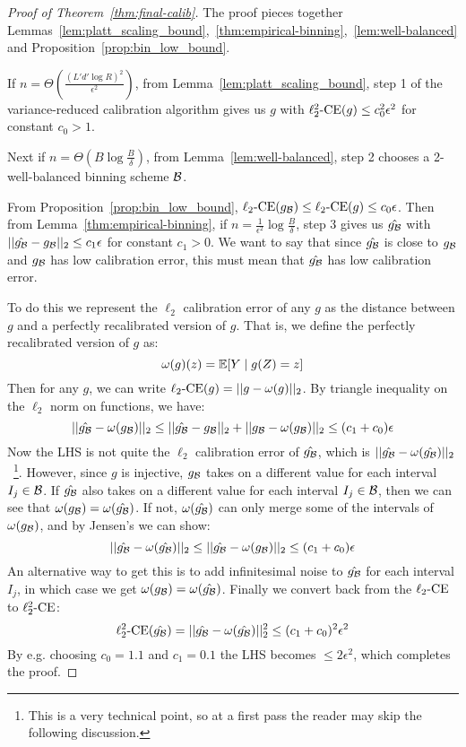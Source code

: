 \begin{proof}[Proof of Theorem~\ref{thm:final-calib}]
The proof pieces together Lemmas~\ref{lem:platt_scaling_bound},~\ref{thm:empirical-binning},~\ref{lem:well-balanced} and Proposition~\ref{prop:bin_low_bound}.

If $n = \Theta(\frac{(L'd'\log{R})^2}{\epsilon^2})$, from Lemma~\ref{lem:platt_scaling_bound}, step 1 of the variance-reduced calibration algorithm gives us $g$ with $\ell_2^2\mbox{-CE}(g) \leq c_0^2 \epsilon^2$ for constant $c_0 > 1$.

Next if $n = \Theta(B \log{\frac{B}{\delta}})$, from Lemma~\ref{lem:well-balanced}, step 2 chooses a 2-well-balanced binning scheme $\mathcal{B}{}$.

From Proposition~\ref{prop:bin_low_bound}, $\ell_2\mbox{-CE}(g_{\mathcal{B}{}}) \leq \ell_2\mbox{-CE}(g) \leq c_0 \epsilon$. Then from Lemma~\ref{thm:empirical-binning}, if $n = \frac{1}{\epsilon^2} \log{\frac{B}{\delta}}$, step 3 gives us $\hat{g_{\mathcal{B}{}}}$ with $||\hat{g_{\mathcal{B}{}}} - g_{\mathcal{B}{}}||_2 \leq c_1 \epsilon$ for constant $c_1 > 0$. We want to say that since $\hat{g_{\mathcal{B}{}}}$ is close to $g_{\mathcal{B}{}}$ and $g_{\mathcal{B}{}}$ has low calibration error, this must mean that $\hat{g_{\mathcal{B}{}}}$ has low calibration error.

To do this we represent the $\ell_2$ calibration error of any $g$ as the distance between $g$ and a perfectly recalibrated version of $g$. That is, we define the perfectly recalibrated version of $g$ as:
\[ \omega(g)(z) = \mathbb{E}[ Y \mid g(Z) = z ] \]
Then for any $g$, we can write $\ell_2\mbox{-CE}(g) = ||g - \omega(g)||_2$. By triangle inequality on the $\ell_2$ norm on functions, we have:
\[ ||\hat{g_{\mathcal{B}{}}} - \omega(g_{\mathcal{B}{}})||_2 \leq ||\hat{g_{\mathcal{B}{}}} - g_{\mathcal{B}{}}||_2 + ||g_{\mathcal{B}{}} - \omega(g_{\mathcal{B}{}})||_2 \leq (c_1 + c_0)\epsilon \]
Now the LHS is not quite the $\ell_2$ calibration error of $\hat{g_{\mathcal{B}{}}}$, which is $||\hat{g_{\mathcal{B}{}}} - \omega(\hat{g_{\mathcal{B}{}}})||_2$~\footnote{This is a very technical point, so at a first pass the reader may skip the following discussion.}.
However, since $g$ is injective, $g_{\mathcal{B}{}}$ takes on a different value for each interval $I_j \in \mathcal{B}{}$.
If $\hat{g_{\mathcal{B}{}}}$ also takes on a different value for each interval $I_j \in \mathcal{B}{}$, then we can see that $\omega(g_{\mathcal{B}{}}) = \omega(\hat{g_{\mathcal{B}{}}})$.
If not, $\omega(\hat{g_{\mathcal{B}{}}})$ can only merge some of the intervals of $\omega(g_{\mathcal{B}{}})$, and by Jensen's we can show:
\[ ||\hat{g_{\mathcal{B}{}}} - \omega(\hat{g_{\mathcal{B}{}}})||_2 \leq ||\hat{g_{\mathcal{B}{}}} - \omega(g_{\mathcal{B}{}})||_2 \leq (c_1 + c_0)\epsilon \]
An alternative way to get this is to add infinitesimal noise to $\hat{g_{\mathcal{B}{}}}$ for each interval $I_j$, in which case we get $\omega(g_{\mathcal{B}{}}) = \omega(\hat{g_{\mathcal{B}{}}})$.
Finally we convert back from the $\ell_2\mbox{-CE}$ to $\ell_2^2\mbox{-CE}$:
\[ \ell_2^2\mbox{-CE}(\hat{g_{\mathcal{B}{}}}) = ||\hat{g_{\mathcal{B}{}}} - \omega(\hat{g_{\mathcal{B}{}}})||_2^2 \leq (c_1 + c_0)^2 \epsilon^2 \]
By e.g. choosing $c_0 = 1.1$ and $c_1 = 0.1$ the LHS becomes $\leq 2\epsilon^2$, which completes the proof.


\end{proof}

